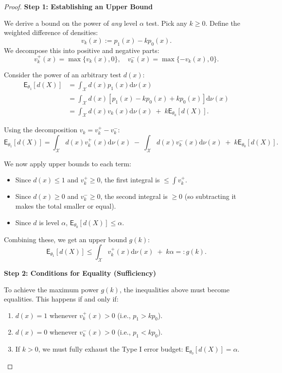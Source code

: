 \begin{proof}
\textbf{Step 1: Establishing an Upper Bound}

We derive a bound on the power of \textit{any} level $\alpha$ test. Pick any $k \ge 0$. Define the weighted difference of densities:
\[ v_k(x) := p_1(x) - k p_0(x). \]
We decompose this into positive and negative parts:
\[ v_k^+(x) = \max\{v_k(x), 0\}, \quad v_k^-(x) = \max\{-v_k(x), 0\}. \]

Consider the power of an arbitrary test $d(x)$:
\[
\begin{split} 
\mathsf{E}_{\theta_{1}}[d(X)] &= \int_{\mathcal{X}} d(x) p_{1}(x) \mathrm{d}\nu(x) \\
&= \int_{\mathcal{X}} d(x) [p_{1}(x) - k p_{0}(x) + k p_{0}(x)] \mathrm{d}\nu(x) \\ 
&= \int_{\mathcal{X}} d(x) v_{k}(x) \mathrm{d}\nu(x) \; + \; k \mathsf{E}_{\theta_{0}}[d(X)].
\end{split}
\]

Using the decomposition $v_k = v_k^+ - v_k^-$:
\[
\mathsf{E}_{\theta_{1}}[d(X)] = \int_{\mathcal{X}} d(x) v_{k}^{+}(x) \mathrm{d}\nu(x) \; - \; \int_{\mathcal{X}} d(x) v_{k}^{-}(x) \mathrm{d}\nu(x) \; + \; k \mathsf{E}_{\theta_{0}}[d(X)].
\]

We now apply upper bounds to each term:
\begin{itemize}
    \item Since $d(x) \le 1$ and $v_k^+ \ge 0$, the first integral is $\le \int v_k^+$.
    \item Since $d(x) \ge 0$ and $v_k^- \ge 0$, the second integral is $\ge 0$ (so subtracting it makes the total smaller or equal).
    \item Since $d$ is level $\alpha$, $\mathsf{E}_{\theta_0}[d(X)] \le \alpha$.
\end{itemize}

Combining these, we get an upper bound $g(k)$:
\[
\mathsf{E}_{\theta_{1}}[d(X)] \leq \int_{\mathcal{X}} v_{k}^{+}(x) \mathrm{d}\nu(x) \; + \; k\alpha =: g(k).
\]

\textbf{Step 2: Conditions for Equality (Sufficiency)}

To achieve the maximum power $g(k)$, the inequalities above must become equalities. This happens if and only if:
\begin{enumerate}[label=\roman*)]
    \item $d(x) = 1$ whenever $v_k^+(x) > 0$ (i.e., $p_1 > k p_0$).
    \item $d(x) = 0$ whenever $v_k^-(x) > 0$ (i.e., $p_1 < k p_0$).
    \item If $k > 0$, we must fully exhaust the Type I error budget: $\mathsf{E}_{\theta_0}[d(X)] = \alpha$.
\end{enumerate}


\end{proof}
